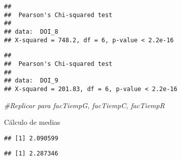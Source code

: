 \documentclass[
]{article}
\newenvironment{Shaded}{\begin{snugshade}}{\end{snugshade}}
\newcommand{\CommentTok}[1]{\textcolor[rgb]{0.56,0.35,0.01}{\textit{#1}}}
\newcommand{\DataTypeTok}[1]{\textcolor[rgb]{0.13,0.29,0.53}{#1}}
\newcommand{\DecValTok}[1]{\textcolor[rgb]{0.00,0.00,0.81}{#1}}
\newcommand{\KeywordTok}[1]{\textcolor[rgb]{0.13,0.29,0.53}{\textbf{#1}}}
\newcommand{\NormalTok}[1]{#1}
\newcommand{\OperatorTok}[1]{\textcolor[rgb]{0.81,0.36,0.00}{\textbf{#1}}}
\newcommand{\OtherTok}[1]{\textcolor[rgb]{0.56,0.35,0.01}{#1}}
\begin{document}
\begin{verbatim}
## 
##  Pearson's Chi-squared test
## 
## data:  DOI_8
## X-squared = 748.2, df = 6, p-value < 2.2e-16
\end{verbatim}

\begin{Shaded}
\end{Shaded}

\begin{verbatim}
## 
##  Pearson's Chi-squared test
## 
## data:  DOI_9
## X-squared = 201.83, df = 6, p-value < 2.2e-16
\end{verbatim}

\begin{Shaded}
\begin{Highlighting}[]
    \CommentTok{#Replicar para facTiempG, facTiempC, facTiempR}
\end{Highlighting}
\end{Shaded}

Cálculo de medias

\begin{Shaded}
\end{Shaded}

\begin{verbatim}
## [1] 2.090599
\end{verbatim}

\begin{Shaded}
\end{Shaded}

\begin{verbatim}
## [1] 2.287346
\end{verbatim}

\begin{Shaded}
\end{Shaded}
\end{document}
